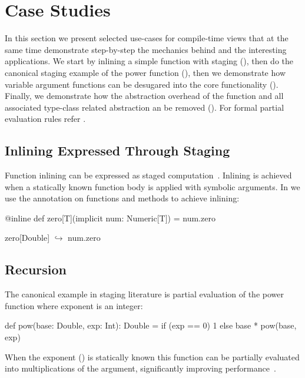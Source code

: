 \section{Case Studies}
\label{sct:case-studies}

In this section we present selected use-cases for compile-time views that at the
same  time demonstrate step-by-step the mechanics behind \tool and the
interesting applications.  We start by inlining a simple function with staging
(), then do the canonical staging  example of the power function
(), then we demonstrate how variable argument functions can
be  desugared into the core functionality (). Finally, we
demonstrate how the abstraction overhead of the  function and all
associated type-class related abstraction an be removed ().
For formal partial evaluation rules refer \cf {}.

\subsection{Inlining Expressed Through Staging}
\label{sct:inlining}

Function inlining can be expressed as staged computation~\cite{monnier2003inlining}.
 Inlining is achieved when a statically known function body is applied with symbolic
 arguments. In \tool we use the  annotation on functions and methods to achieve inlining:\begin{lstparagraph}
@inline def zero[T](implicit num: Numeric[T]) = num.zero

zero[Double]
  $\hookrightarrow$ num.zero
\end{lstparagraph}


\subsection{Recursion}
\label{sct:recursion}

The canonical example in staging literature is partial evaluation of the power function
 where exponent is an integer:
\begin{lstparagraph}
def pow(base: Double, exp: Int): Double =
  if (exp == 0) 1 else base * pow(base, exp)
\end{lstparagraph} When the exponent () is statically known this function can be partially
evaluated into  multiplications of the  argument, significantly
improving performance~\cite{calcagno2003implementing}.

